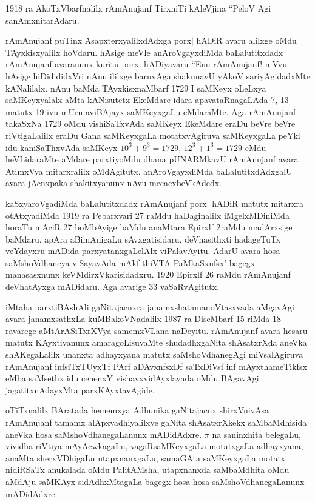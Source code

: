 {\rm 1918} ra AkoTxVbarfnalilx rAmAnujanf TirxniTi kAleVjina ``PeloV Agi sanAmxnitarAdaru.

rAmAnujanf puTinx AsapxterxyalilxdAdxga porx| hADiR avaru alilxge oMdu TAyxkisx\-yalilx hoVdaru. hAsige meVle anAroVgayxdiMda baLalutitxdadx rAmAnujanf ava\-ranunx kuritu porx| hADiyavaru ``Enu rAmAnujanf! niVvu hAsige hiDidididxVri nAnu ililxge baruvAga shakunavU yAkoV sariyAgidadxMte kANalilalx. nAnu baMda TAyxkisx\break naMbarf {\rm 1729} I saMKeyx oLeLxya saMKeyxyalalx aMta kANisutetx EkeMdare idara apavataRnagaLAda {\rm 7, 13} matutx {\rm 19} ivu mUru aviBAjayx saMKeyxgaLu eMdaraMte. Aga rAmAnujanf takaSxNa {\rm 1729} oMdu vishiSaTxvAda saMKeyx EkeMdare eraDu beVre beVre riVtigaLalilx eraDu Gana saMKeyxgaLa motatxvAgiruva saMKeyxgaLa peYki idu kaniSaThxvAda saMKeyx $10^{3}+9^{3}=1729$, $12^{3}+1^{3}=1729$ eMdu heVLidaraMte aMdare parxtiyoMdu dhana pUNARMkavU rAmAnujanf avara AtimxVya mitarxralilx oMdAgitutx. anAroVgayxdiMda baLalutitxdAdxgalU avara jAcnxpaka shakitxyanunx nAvu mecacxbeVkAdedx.

kaSxyaroVgadiMda baLalutitxdadx rAmAnujanf porx| hADiR matutx mitarxra otAtxya\-diMda {\rm 1919} ra Pebarxvari {\rm 27} raMdu haDaginalilx iMgelxMDiniMda horaTu mAciR {\rm 27} boMbAyige baMdu anaMtara Epirxlf {\rm 2}raMdu madArxsige baMdaru. apAra aBimAnigaLu sAvxgatisidaru. deVhasithxti hadageTuTx veYdayxru mADida parxyatanxgaLelAlx viPala\-vAyitu. AdarU avara hosa saMshoVdhaneya viSayavAda mAkf-thiVTA-PaMkaSxnfsx' bagegx manasasxnunx keVMdirxVkarisidadxru. {\rm 1920} Epirxlf {\rm 26} raMdu rAmAnujanf deVhatAyxga mADidaru. Aga avarige {\rm 33} vaSaRvAgitutx.

iMtaha parxtiBAshAli gaNitajacnxra janamxshatamanoVtasxvada aMgavAgi avara janamxsathxLa kuMBakoVNadalilx {\rm 1987} ra DiseMbarf {\rm 15} riMda {\rm 18} ravarege aMtArASiTxrXVya samemxVLana naDeyitu. rAmAnujanf avara hesaru matutx KAyxtiyanunx amaragoLisuvaMte shudadhx\-gaNita shAsatxrXda aneVka shAKegaLalilx unanxta adhayxyana matutx saMshoVdhanegAgi miVsalAgiruva rAmAnujanf infsiTxTUyxTf PArf aDAvxnfsxDf saTxDiVsf inf mAyxthameTikfsx eMba saMsethx idu cenenxY vishavxvidAyxlayada oMdu BAgavAgi jagatitxnAdayxMta parxKAyxtavAgide.

oTiTxnalilx BAratada hememxya Adhunika gaNitajacnx shirxVnivAsa rAmAnujanf tamamx alApxvadhiyalilxye gaNita shAsatxrXkekx saMbaMdhisida aneVka hosa saMshoVdhanegaLanunx mADidAdxre. $\pi$ na saninxhita belegaLu, vividha riVtiya mAyAcwkagaLu, vagaRsaMKeyxgaLa motatxgaLa adhayxyana, anaMta sherxVDhigaLu utapxnanxgaLu, samaGAta saMKeyxgaLa motatx nidiRSaTx anukalada oMdu PalitAMsha, utapxnanxda saMbaMdhita oMdu aMdAju saMKAyx sidAdhxMtagaLa bagegx hosa hosa saMshoVdhanegaLanunx mADidAdxre.

